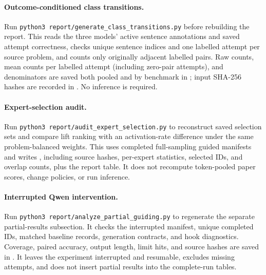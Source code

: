 \paragraph{Outcome-conditioned class transitions.}
Run \texttt{python3 report/generate\_class\_transitions.py} before rebuilding the report.
This reads the three models' active sentence annotations and saved attempt correctness,
checks unique sentence indices and one labelled attempt per source problem, and
counts only originally adjacent labelled pairs. Raw counts, mean counts per labelled
attempt (including zero-pair attempts), and denominators are saved both pooled and
by benchmark in ; input SHA-256 hashes
are recorded in . No inference is required.

\paragraph{Expert-selection audit.}
Run \texttt{python3 report/audit\_expert\_selection.py} to reconstruct saved
selection sets and compare lift ranking with an activation-rate difference
under the same problem-balanced weights. This uses completed full-sampling
guided manifests and writes ,
including source hashes, per-expert statistics, selected IDs, and overlap
counts, plus the report table. It does not recompute token-pooled paper
scores, change policies, or run inference.

\paragraph{Interrupted Qwen intervention.}
Run \texttt{python3 report/analyze\_partial\_guiding.py} to regenerate
the separate partial-results subsection. It checks the interrupted manifest,
unique completed IDs, matched baseline records, generation contracts, and hook
diagnostics. Coverage, paired accuracy, output length, limit hits, and source
hashes are saved in .
It leaves the experiment interrupted and resumable, excludes missing attempts,
and does not insert partial results into the complete-run tables.

